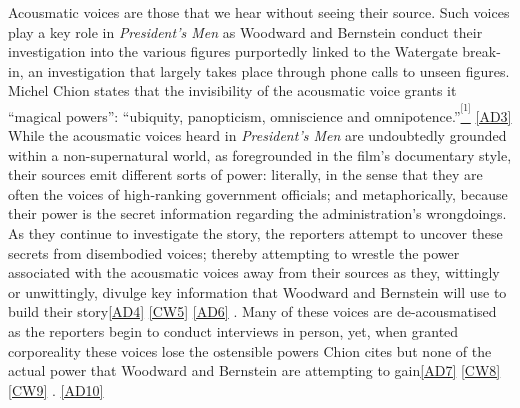 Acousmatic voices are those that we hear without seeing their source.
Such voices play a key role in \textit{President’s Men} as Woodward and Bernstein conduct their investigation into the various figures purportedly linked to the Watergate break-in, an investigation that largely takes place through phone calls to unseen figures.
Michel Chion states that the invisibility of the acousmatic voice grants it ``magical powers”: ``ubiquity, panopticism, omniscience and omnipotence.”\href{applewebdata://3A1D666A-D52A-46D2-8C90-343A1EE58F85\#_ftn1}{\textsuperscript{\textsuperscript{[1]}}} \href{applewebdata://3A1D666A-D52A-46D2-8C90-343A1EE58F85\#_msocom_3}{[AD3]}
While the acousmatic voices heard in \textit{President’s Men} are undoubtedly grounded within a non-supernatural world, as foregrounded in the film’s documentary style, their sources emit different sorts of power:
literally, in the sense that they are often the voices of high-ranking government officials;
and metaphorically, because their power is the secret information regarding the administration’s wrongdoings.
As they continue to investigate the story, the reporters attempt to uncover these secrets from disembodied voices; thereby attempting to wrestle the power associated with the acousmatic voices away from their sources as they, wittingly or unwittingly, divulge key information that Woodward and Bernstein will use to build their story\href{applewebdata://3A1D666A-D52A-46D2-8C90-343A1EE58F85\#_msocom_4}{[AD4]} \href{applewebdata://3A1D666A-D52A-46D2-8C90-343A1EE58F85\#_msocom_5}{[CW5]} \href{applewebdata://3A1D666A-D52A-46D2-8C90-343A1EE58F85\#_msocom_6}{[AD6]} .
Many of these voices are de-acousmatised as the reporters begin to conduct interviews in person, yet, when granted corporeality these voices lose the ostensible powers Chion cites but none of the actual power that Woodward and Bernstein are attempting to gain\href{applewebdata://3A1D666A-D52A-46D2-8C90-343A1EE58F85\#_msocom_7}{[AD7]} \href{applewebdata://3A1D666A-D52A-46D2-8C90-343A1EE58F85\#_msocom_8}{[CW8]} \href{applewebdata://3A1D666A-D52A-46D2-8C90-343A1EE58F85\#_msocom_9}{[CW9]} . \href{applewebdata://3A1D666A-D52A-46D2-8C90-343A1EE58F85\#_msocom_10}{[AD10]} 

